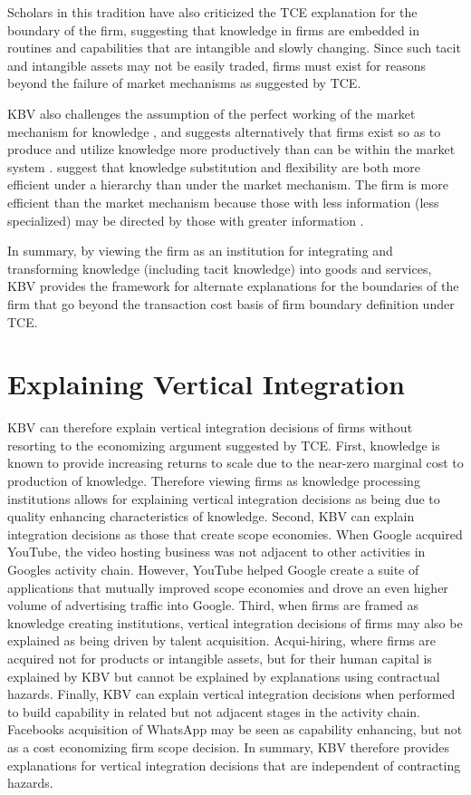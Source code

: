 \documentclass[12pt,letterpaper]{article}
\begin{document}
Scholars in this tradition have also criticized the TCE explanation for the boundary of the firm, suggesting  that knowledge in firms are embedded in routines and capabilities \citep{Kogut1993} that are intangible and slowly changing. Since such tacit and intangible assets may not be easily traded, firms must exist for reasons beyond the failure of market mechanisms as suggested by TCE. 

KBV also challenges the assumption of the perfect working of the market mechanism for knowledge \citep{Hayek1945}, and suggests alternatively that firms exist so as to produce and utilize knowledge more productively than can be within the market system \cite{Grant1996b}.  \cite{Conner1996} suggest that knowledge substitution and flexibility are both more efficient under a hierarchy than under the market mechanism. The firm is more efficient than the market mechanism because  those with less information (less specialized) may be directed by those with greater information  \citep{Demsetz1991} . 

In summary, by viewing the firm as an institution for integrating and transforming knowledge (including tacit knowledge) into goods and services, KBV provides the framework for alternate explanations for the boundaries of the firm that go beyond the transaction cost basis of firm boundary definition under TCE. 

\section{Explaining Vertical Integration}
KBV can therefore explain vertical integration decisions of firms without resorting to the economizing argument suggested by TCE. First, knowledge is known to provide increasing returns to scale due to the near-zero marginal cost to production of knowledge. Therefore viewing firms as knowledge processing institutions allows for explaining vertical integration decisions as being due to quality enhancing characteristics of knowledge. Second, KBV can explain integration decisions as those that create scope economies. When Google acquired YouTube, the video hosting business was not adjacent to other activities in Google\textquotesingle s activity chain. However, YouTube helped Google create a suite of applications that mutually improved scope economies and drove an even higher volume of advertising traffic into Google. Third, when firms are framed as knowledge creating institutions, vertical integration decisions of firms may also be explained as being driven by talent acquisition. Acqui-hiring, where firms are acquired not for products or intangible assets, but for their human capital is explained by KBV but cannot be explained by explanations using contractual hazards. Finally, KBV can explain vertical integration decisions when performed to build capability in related but not adjacent stages in the activity chain. Facebook\textquotesingle s acquisition of WhatsApp may be seen as capability enhancing, but not as a cost economizing firm scope decision. In summary, KBV therefore provides explanations for vertical integration decisions that are independent of contracting hazards.
\end{document}
